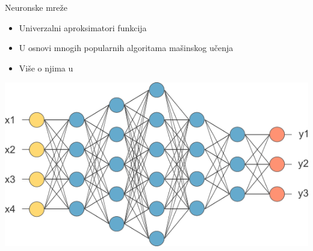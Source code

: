 \documentclass{beamer}
\begin{document}
\begin{frame}{Neuronske mreže}
    \begin{itemize}
        \item Univerzalni aproksimatori funkcija 
        \item U osnovi mnogih popularnih algoritama mašinskog učenja
        \item Više o njima u \cite{Murphy, Bishop, Goodfellow}
    \end{itemize}

    \begin{center}
        \includegraphics[scale=0.5]{./slike/deep_neural_network.png}
    \end{center}
\end{frame}
\end{document}
